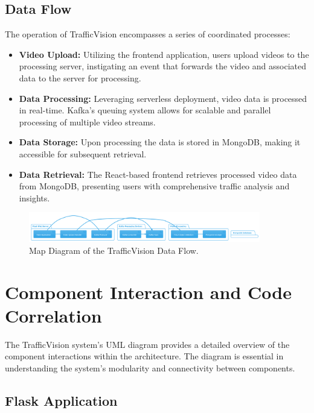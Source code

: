 \subsection{Data Flow}
The operation of TrafficVision encompasses a series of coordinated processes:
\begin{itemize}
    \item \textbf{Video Upload:} Utilizing the frontend application, users upload videos to the processing server, instigating an event that forwards the video and associated data to the server for processing.
    
    \item \textbf{Data Processing:} Leveraging serverless deployment, video data is processed in real-time. Kafka's queuing system allows for scalable and parallel processing of multiple video streams.
    
    \item \textbf{Data Storage:} Upon processing the data is stored in MongoDB, making it accessible for subsequent retrieval.
    
    \item \textbf{Data Retrieval:} The React-based frontend retrieves processed video data from MongoDB, presenting users with comprehensive traffic analysis and insights.
\end{itemize}

\begin{figure}[H]
    \centering
    \includegraphics[width=0.9\textwidth]{images/mapDiagram.png}
    \caption{Map Diagram of the TrafficVision Data Flow.}
    \label{fig:mapDiagram}
\end{figure}


\section{Component Interaction and Code Correlation}

The TrafficVision system's UML\cite{umlDiagramMiro} diagram provides a detailed overview of the component interactions within the architecture. The diagram is essential in understanding the system's modularity and connectivity between components.

\subsection{Flask Application}


